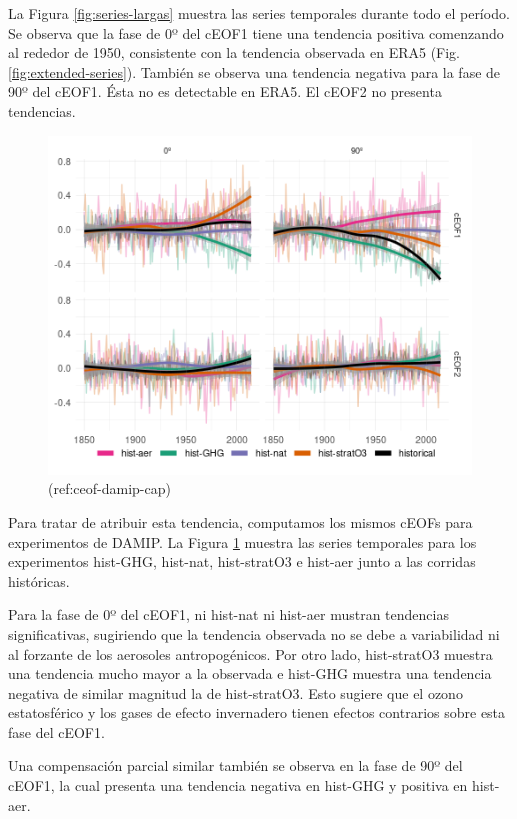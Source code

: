 \documentclass[12pt,oneside]{reedthesis}
\begin{document}
La Figura \ref{fig:series-largas} muestra las series temporales durante todo el período.
Se observa que la fase de 0º del cEOF1 tiene una tendencia positiva comenzando al rededor de 1950, consistente con la tendencia observada en ERA5 (Fig. \ref{fig:extended-series}).
También se observa una tendencia negativa para la fase de 90º del cEOF1.
Ésta no es detectable en ERA5.
El cEOF2 no presenta tendencias.

\begin{figure}
\includegraphics{figures/50-cmip6/ceof-damip-1} \caption{(ref:ceof-damip-cap)}\label{fig:ceof-damip}
\end{figure}

Para tratar de atribuir esta tendencia, computamos los mismos cEOFs para experimentos de DAMIP.
La Figura \ref{fig:ceof-damip} muestra las series temporales para los experimentos hist-GHG, hist-nat, hist-stratO3 e hist-aer junto a las corridas históricas.

Para la fase de 0º del cEOF1, ni hist-nat ni hist-aer mustran tendencias significativas, sugiriendo que la tendencia observada no se debe a variabilidad ni al forzante de los aerosoles antropogénicos.
Por otro lado, hist-stratO3 muestra una tendencia mucho mayor a la observada e hist-GHG muestra una tendencia negativa de similar magnitud la de hist-stratO3.
Esto sugiere que el ozono estatosférico y los gases de efecto invernadero tienen efectos contrarios sobre esta fase del cEOF1.

Una compensación parcial similar también se observa en la fase de 90º del cEOF1, la cual presenta una tendencia negativa en hist-GHG y positiva en hist-aer.
\end{document}
